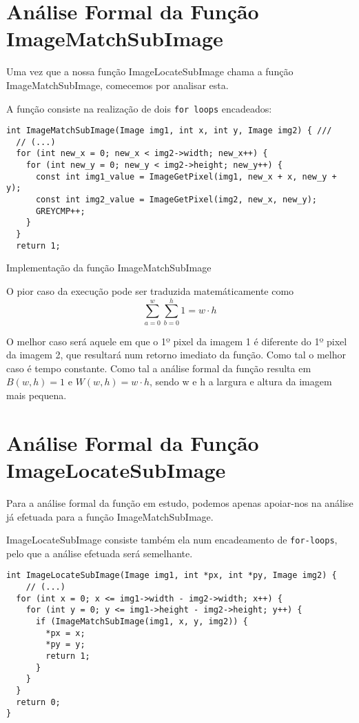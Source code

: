 \section{Análise Formal da Função ImageMatchSubImage}
\renewcommand{\listingscaption}{Código:}
Uma vez que a nossa função ImageLocateSubImage chama a
função ImageMatchSubImage, comecemos por analisar esta.

A função consiste na realização de dois \verb|for loops|
encadeados:
\begin{listing}[H]
	\centering
	\begin{verbatim}
int ImageMatchSubImage(Image img1, int x, int y, Image img2) { ///
  // (...)
  for (int new_x = 0; new_x < img2->width; new_x++) {
    for (int new_y = 0; new_y < img2->height; new_y++) {
      const int img1_value = ImageGetPixel(img1, new_x + x, new_y + y);
      const int img2_value = ImageGetPixel(img2, new_x, new_y);
      GREYCMP++;
    }
  }
  return 1;
\end{verbatim}
	\caption{Implementação da função ImageMatchSubImage}
\end{listing}

O pior caso da execução pode ser traduzida matemáticamente como
\begin{equation}
	\sum_{a=0}^{w}\sum_{b=0}^{h}1 = w \cdot h
\end{equation}

O melhor caso será aquele em que o 1º pixel da imagem
1 é diferente do 1º pixel da imagem 2, que resultará num
retorno imediato da função. Como tal o melhor caso é tempo
constante.
Como tal a análise formal da função resulta em $B(w,h) = 1$
e $W(w,h) = w \cdot h$, sendo w e h a largura e altura da
imagem mais pequena.


\section{Análise Formal da Função ImageLocateSubImage}

Para a análise formal da função em estudo, podemos apenas
apoiar-nos na análise já efetuada para a função
ImageMatchSubImage.

ImageLocateSubImage consiste também ela num encadeamento de
\verb|for-loops|, pelo que a análise efetuada será
semelhante.

\begin{listing}[H]
	\centering
	\begin{verbatim}
int ImageLocateSubImage(Image img1, int *px, int *py, Image img2) {
    // (...)
  for (int x = 0; x <= img1->width - img2->width; x++) {
    for (int y = 0; y <= img1->height - img2->height; y++) {
      if (ImageMatchSubImage(img1, x, y, img2)) {
        *px = x;
        *py = y;
        return 1;
      }
    }
  }
  return 0;
}
  \end{verbatim}
\end{listing}


